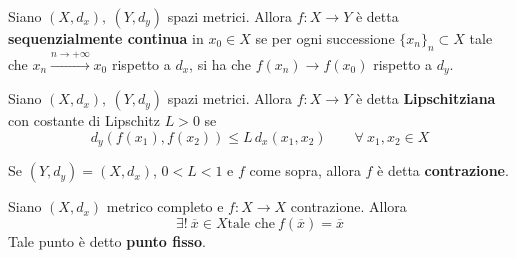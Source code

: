 \begin{definition} \label{Def: Funzione sequenzialmente continua}
    Siano $(X, d_x),\ (Y, d_y)$ spazi metrici. Allora $f: X \to Y$ è detta \textbf{sequenzialmente continua} in $x_0 \in X$ se per ogni successione $\{x_n\}_n \subset X$ tale che $x_n \xrightarrow{n\to +\infty} x_0$ rispetto a $d_x$, si ha che $f(x_n) \to f(x_0)$ rispetto a $d_y$.
\end{definition}
\begin{definition} \label{Def: Lipschitziana}
     Siano $(X, d_x),\ (Y, d_y)$ spazi metrici. Allora $f: X \to Y$ è detta \textbf{Lipschitziana} con costante di Lipschitz $L>0$ se 
     \begin{equation*}
         d_y(f(x_1), f(x_2)) \leq L\,d_x(x_1, x_2) \qquad \forall\ x_1, x_2\in X
     \end{equation*}
    \end{definition}
\begin{definition} \label{Def: Contrazione}
     Se $(Y, d_y)=(X, d_x)$, $0<L<1$ e $f$ come sopra, allora $f$ è detta \textbf{contrazione}.
\end{definition}
\begin{theorem} \label{Teo: delle contrazioni}
    Siano $(X, d_x)$ metrico completo e $f: X \to X$ contrazione. Allora 
    \begin{equation*}
    \exists!\ \overline{x} \in X \text{tale che}\ f(\overline{x})=\overline{x} 
    \end{equation*}
    Tale punto è detto \textbf{punto fisso}.
\end{theorem}
